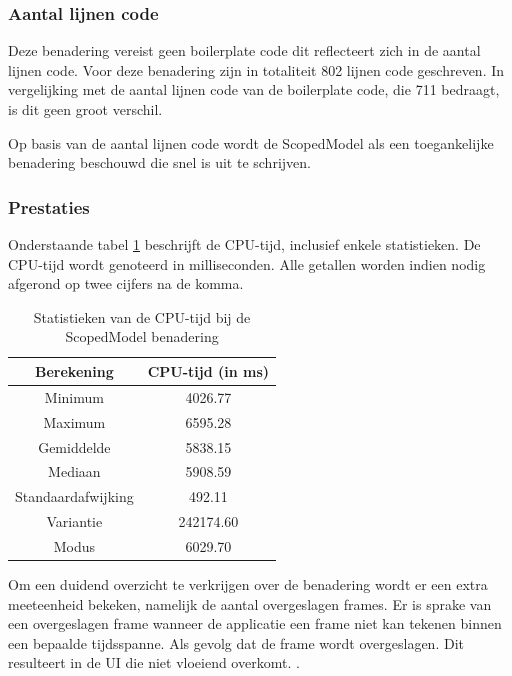 \subsubsection{Aantal lijnen code}
Deze benadering vereist geen boilerplate code dit reflecteert zich in de aantal lijnen code. Voor deze benadering zijn in totaliteit 802 lijnen code geschreven. In vergelijking met de aantal lijnen code van de boilerplate code, die 711 bedraagt, is dit geen groot verschil. 

Op basis van de aantal lijnen code wordt de ScopedModel als een toegankelijke benadering beschouwd die snel is uit te schrijven.

\subsubsection{Prestaties}
Onderstaande tabel \ref{table:experiment-scopedmodel-statistics} beschrijft de CPU-tijd, inclusief enkele statistieken. De CPU-tijd wordt genoteerd in milliseconden. Alle getallen worden indien nodig afgerond op twee cijfers na de komma.
\begin{table}[H]
    \centering
    \begin{tabular}{c|c}
        \textbf{Berekening} & \textbf{CPU-tijd (in ms)}  \\ \hline
        Minimum             & 4026.77                    \\ \hline
        Maximum             & 6595.28                    \\ \hline
        Gemiddelde          & 5838.15                    \\ \hline
        Mediaan             & 5908.59                    \\ \hline
        Standaardafwijking  & 492.11                     \\ \hline
        Variantie           & 242174.60                  \\ \hline
        Modus               & 6029.70                      \\                
    \end{tabular}
    \caption{Statistieken van de CPU-tijd bij de ScopedModel benadering}
    \label{table:experiment-scopedmodel-statistics}
\end{table}

Om een duidend overzicht te verkrijgen over de benadering wordt er een extra meeteenheid bekeken, namelijk de aantal overgeslagen frames. Er is sprake van een overgeslagen frame wanneer de applicatie een frame niet kan tekenen binnen een bepaalde tijdsspanne. Als gevolg dat de frame wordt overgeslagen. Dit resulteert in de UI die niet vloeiend overkomt. \autocite{Flutter2019d}.

